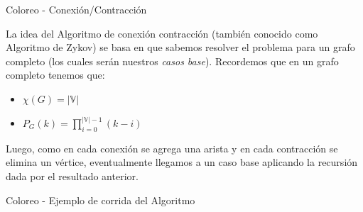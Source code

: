 \documentclass[10pt]{beamer}
\newcommand \anchoPagina{1.0} %
\begin{document}
\begin{frame}{Coloreo - Conexi\'on/Contracci\'on}
	\begin{minipage}{\anchoPagina \textwidth}
	    \small
		La idea del Algoritmo de conexi\'on contracci\'on (también conocido como Algoritmo de Zykov) se basa en que sabemos resolver el problema para un grafo completo (los cuales ser\'an nuestros \textit{casos base}). Recordemos que en un grafo completo tenemos que:
		\pause
		\begin{itemize}
			\item $\chi(G) = |\mathbb{V}|$
			\item $P_{G}(k) = \prod\limits_{i = 0}^{|\mathbb{V}|-1} (k-i)$
		\end{itemize}
		Luego, como en cada conexi\'on se agrega una arista y en cada contracci\'on se elimina un v\'ertice, eventualmente llegamos a un caso base aplicando la recursi\'on dada por el resultado anterior.
		\pause
%
	\end{minipage}
\end{frame}

\begin{frame}{Coloreo - Ejemplo de corrida del Algoritmo}
	\begin{minipage}{\anchoPagina \textwidth}
		\centering
	\end{minipage}
\end{frame}
\end{document}
